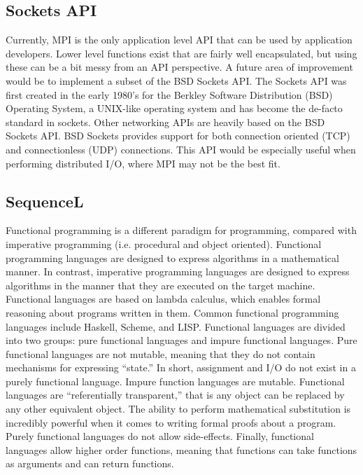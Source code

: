 \subsection{Sockets API}\label{sec:conclusions:future_work:sockets_api}

Currently, MPI is the only application level API that can be used by application developers. Lower level functions exist that are fairly well encapsulated, but using these can be a bit messy from an API perspective. A future area of improvement would be to implement a subset of the BSD Sockets API. The Sockets API was first created in the early 1980's for the Berkley Software Distribution (BSD) Operating System, a UNIX-like operating system and has become the de-facto standard in sockets. Other networking APIs are heavily based on the BSD Sockets API. BSD Sockets provides support for both connection oriented (TCP) and connectionless (UDP) connections. This API would be especially useful when performing distributed I/O, where MPI may not be the best fit. \cite{ref:2003-stevens-unix_network_programming}

\subsection{SequenceL} \label{sec:conclusions:future_work:sequencel}

Functional programming is a different paradigm for programming, compared with imperative programming (i.e. procedural and object oriented). Functional programming languages are designed to express algorithms in a mathematical manner. In contrast, imperative programming languages are designed to express algorithms in the manner that they are executed on the target machine. Functional languages are based on lambda calculus, which enables formal reasoning about programs written in them. Common functional programming languages include Haskell, Scheme, and LISP. Functional languages are divided into two groups: pure functional languages and impure functional languages. Pure functional languages are not mutable, meaning that they do not contain mechanisms for expressing ``state.'' In short, assignment and I/O do not exist in a purely functional language. Impure function languages are mutable. Functional languages are ``referentially transparent,'' that is any object can be replaced by any other equivalent object. The ability to perform mathematical substitution is incredibly powerful when it comes to writing formal proofs about a program. Purely functional languages do not allow side-effects. Finally, functional languages allow higher order functions, meaning that functions can take functions as arguments and can return functions. \cite{ref:1996-goldberg-functional_programming_languages}

